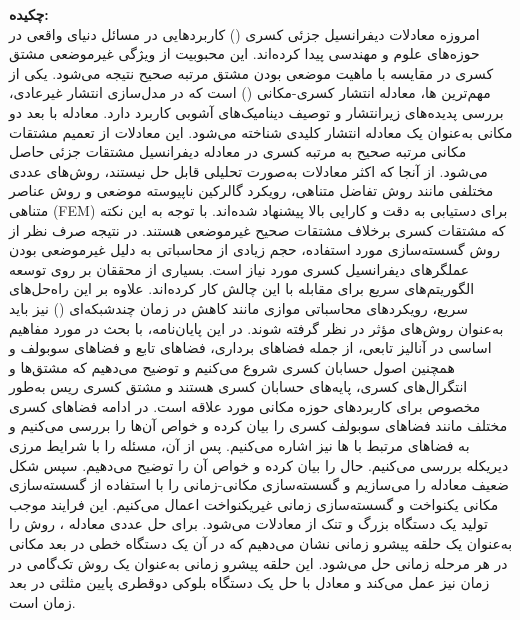 \vspace*{-1cm}                   %
\thispagestyle{empty}
{\large\bf چکیده: }  
\vspace*{0.1cm}
\\
{\small
امروزه معادلات دیفرانسیل جزئی کسری
()
کاربردهایی در مسائل دنیای واقعی در حوزه‌های علوم و مهندسی پیدا کرده‌اند.
این محبوبیت از ویژگی غیرموضعی مشتق کسری در مقایسه با ماهیت موضعی بودن مشتق مرتبه صحیح نتیجه می‌شود.
یکی از مهم‌ترین
ها،
معادله انتشار کسری-مکانی
()
است که در مدل‌سازی انتشار غیرعادی، بررسی پدیده‌های زیرانتشار و توصیف دینامیک‌های آشوبی کاربرد دارد.
معادله
با بعد دو مکانی به‌عنوان یک معادله انتشار کلیدی شناخته می‌شود.
این معادلات از تعمیم مشتقات مکانی مرتبه صحیح به مرتبه کسری در معادله دیفرانسیل مشتقات جزئی حاصل می‌شود.
از آنجا که اکثر معادلات 
به‌صورت تحلیلی قابل حل نیستند، روش‌های عددی مختلفی مانند روش تفاضل متناهی، رویکرد گالرکین ناپیوسته موضعی و روش عناصر متناهی (FEM) برای دستیابی به دقت و کارایی بالا پیشنهاد شده‌اند.
با توجه به این نکته که مشتقات کسری برخلاف مشتقات صحیح غیرموضعی هستند.
در نتیجه صرف نظر از روش گسسته‌سازی مورد استفاده، حجم زیادی از محاسباتی به دلیل غیرموضعی بودن عملگرهای دیفرانسیل کسری مورد نیاز است.
بسیاری از محققان بر روی توسعه الگوریتم‌های سریع برای مقابله با این چالش کار کرده‌اند.
علاوه بر این راه‌حل‌های سریع، رویکردهای محاسباتی موازی مانند کاهش در زمان چندشبکه‌ای
()
نیز باید به‌عنوان روش‌های مؤثر در نظر گرفته شوند.
در این پایان‌نامه، با بحث در مورد مفاهیم اساسی در آنالیز تابعی، از جمله فضاهای برداری، فضاهای تابع و فضاهای سوبولف و همچنین اصول حسابان کسری شروع می‌کنیم و توضیح می‌دهیم که مشتق‌ها و انتگرال‌های کسری، پایه‌های حسابان کسری هستند و مشتق کسری ریس به‌طور مخصوص برای کاربردهای حوزه مکانی مورد علاقه است.
در ادامه فضاهای کسری مختلف مانند فضاهای سوبولف کسری را بیان کرده و خواص آن‌ها را بررسی می‌کنیم و به فضاهای مرتبط با
ها
نیز اشاره می‌کنیم.
پس از آن، مسئله
را با شرایط مرزی دیریکله بررسی می‌کنیم.
حال
را بیان کرده و خواص آن را توضیح می‌دهیم.
سپس شکل ضعیف معادله
را می‌سازیم و گسسته‌سازی مکانی-زمانی را با استفاده از گسسته‌سازی مکانی یکنواخت و گسسته‌سازی زمانی غیریکنواخت اعمال می‌کنیم.
این فرایند موجب تولید یک دستگاه بزرگ و تنک از معادلات می‌شود.
برای حل عددی معادله
،
روش را به‌عنوان یک حلقه پیشرو زمانی نشان می‌دهیم که در آن یک دستگاه خطی در بعد مکانی در هر مرحله زمانی حل می‌شود.
این حلقه پیشرو زمانی به‌عنوان یک روش تک‌گامی در زمان نیز عمل می‌کند و معادل با حل یک دستگاه بلوکی دوقطری پایین مثلثی در بعد زمان است. 
}

